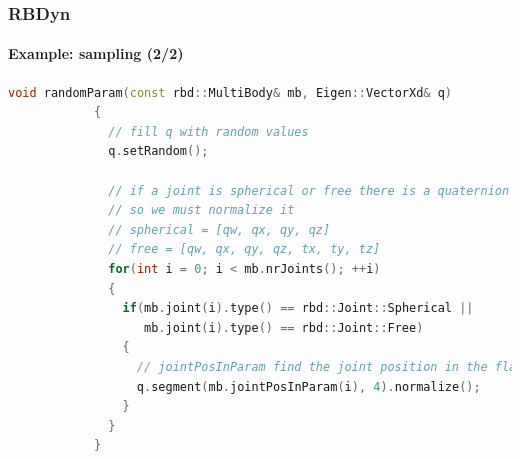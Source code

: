\documentclass{beamer}
\begin{document}
	\begin{frame}[fragile]
		\frametitle{RBDyn}
		\framesubtitle{Example: sampling (2/2)}
		\begin{lstlisting}[language=C++,basicstyle=\tiny]
			void randomParam(const rbd::MultiBody& mb, Eigen::VectorXd& q)
			{
			  // fill q with random values
			  q.setRandom();

			  // if a joint is spherical or free there is a quaternion inside
			  // so we must normalize it
			  // spherical = [qw, qx, qy, qz]
			  // free = [qw, qx, qy, qz, tx, ty, tz]
			  for(int i = 0; i < mb.nrJoints(); ++i)
			  {
			    if(mb.joint(i).type() == rbd::Joint::Spherical ||
			       mb.joint(i).type() == rbd::Joint::Free)
			    {
			      // jointPosInParam find the joint position in the flat q vector
			      q.segment(mb.jointPosInParam(i), 4).normalize();
			    }
			  }
			}
		\end{lstlisting}
	\end{frame}
\end{document}

